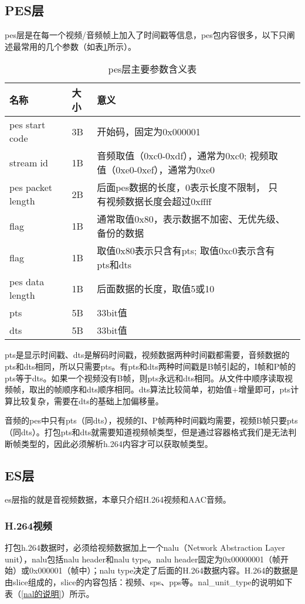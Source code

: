 \documentclass[bachelor]{thesis-uestc}
\begin{document}
\subsection{PES层}
\par pes层是在每一个视频/音频帧上加入了时间戳等信息，pes包内容很多，以下只阐述最常用的几个参数（如表\ref{pes层主要参数含义表}所示）。

\begin{table}[!h]
\centering
\caption{pes层主要参数含义表}
\label{pes层主要参数含义表}
\begin{tabular}{lp{3cm}p{6cm}p{2cm}}
\toprule
名称	&  大小 & 意义 \\
\midrule
pes start code	& 3B &	开始码，固定为0x000001\\
stream id &	1B &	音频取值（0xc0-0xdf），通常为0xc0; 视频取值（0xe0-0xef），通常为0xe0\\
pes packet length	& 2B &	后面pes数据的长度，0表示长度不限制，
只有视频数据长度会超过0xffff\\
flag	& 1B &	通常取值0x80，表示数据不加密、无优先级、备份的数据\\
flag	& 1B &	取值0x80表示只含有pts; 取值0xc0表示含有pts和dts\\
pes data length	 &1B &	后面数据的长度，取值5或10\\
pts &	5B &	33bit值\\
dts	& 5B &	33bit值\\

\bottomrule 
\end{tabular}
\end{table}

\par pts是显示时间戳、dts是解码时间戳，视频数据两种时间戳都需要，音频数据的pts和dts相同，所以只需要pts。有pts和dts两种时间戳是B帧引起的，I帧和P帧的pts等于dts。如果一个视频没有B帧，则pts永远和dts相同。从文件中顺序读取视频帧，取出的帧顺序和dts顺序相同。dts算法比较简单，初始值+增量即可，pts计算比较复杂，需要在dts的基础上加偏移量。
\par 音频的pes中只有pts（同dts），视频的I、P帧两种时间戳均需要，视频B帧只要pts（同dts）。打包pts和dts就需要知道视频帧类型，但是通过容器格式我们是无法判断帧类型的，因此必须解析h.264内容才可以获取帧类型。
     


\subsection{ES层}
es层指的就是音视频数据，本章只介绍H.264视频和AAC音频。
\subsubsection{H.264视频}
打包h.264数据时，必须给视频数据加上一个nalu（Network Abstraction Layer unit），nalu包括nalu header和nalu type。nalu header固定为0x00000001（帧开始）或0x000001（帧中）；nalu type决定了后面的H.264数据内容。H.264的数据是由slice组成的，slice的内容包括：视频、sps、pps等。nal\_unit\_type的说明如下表（\ref{nal的说明}）所示。
\end{document}
